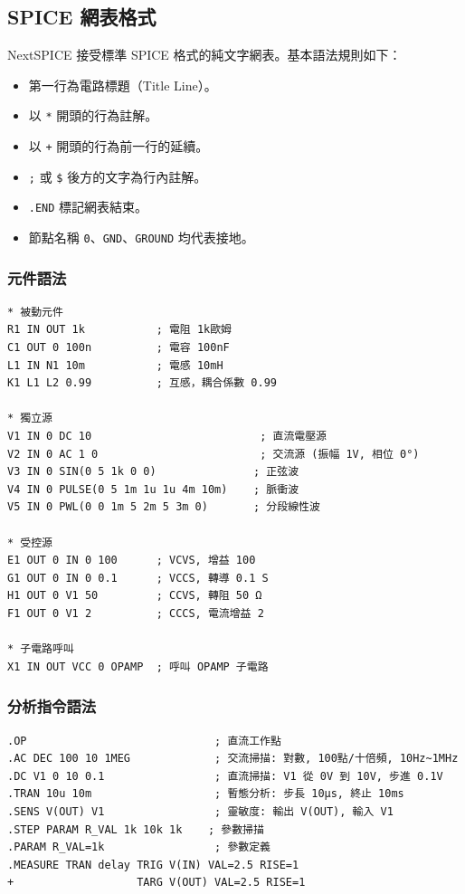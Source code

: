 \documentclass[12pt,a4paper]{article}
\begin{document}
\subsection{SPICE 網表格式}

NextSPICE 接受標準 SPICE 格式的純文字網表。基本語法規則如下：

\begin{itemize}
  \item 第一行為電路標題（Title Line）。
  \item 以 \texttt{*} 開頭的行為註解。
  \item 以 \texttt{+} 開頭的行為前一行的延續。
  \item \texttt{;} 或 \texttt{\$} 後方的文字為行內註解。
  \item \texttt{.END} 標記網表結束。
  \item 節點名稱 \texttt{0}、\texttt{GND}、\texttt{GROUND} 均代表接地。
\end{itemize}

\subsubsection{元件語法}

\begin{lstlisting}[language=SPICE,caption={元件定義範例}]
* 被動元件
R1 IN OUT 1k           ; 電阻 1k歐姆
C1 OUT 0 100n          ; 電容 100nF
L1 IN N1 10m           ; 電感 10mH
K1 L1 L2 0.99          ; 互感，耦合係數 0.99

* 獨立源
V1 IN 0 DC 10                          ; 直流電壓源
V2 IN 0 AC 1 0                         ; 交流源 (振幅 1V, 相位 0°)
V3 IN 0 SIN(0 5 1k 0 0)               ; 正弦波
V4 IN 0 PULSE(0 5 1m 1u 1u 4m 10m)    ; 脈衝波
V5 IN 0 PWL(0 0 1m 5 2m 5 3m 0)       ; 分段線性波

* 受控源
E1 OUT 0 IN 0 100      ; VCVS, 增益 100
G1 OUT 0 IN 0 0.1      ; VCCS, 轉導 0.1 S
H1 OUT 0 V1 50         ; CCVS, 轉阻 50 Ω
F1 OUT 0 V1 2          ; CCCS, 電流增益 2

* 子電路呼叫
X1 IN OUT VCC 0 OPAMP  ; 呼叫 OPAMP 子電路
\end{lstlisting}

\subsubsection{分析指令語法}

\begin{lstlisting}[language=SPICE,caption={分析指令範例}]
.OP                             ; 直流工作點
.AC DEC 100 10 1MEG             ; 交流掃描: 對數, 100點/十倍頻, 10Hz~1MHz
.DC V1 0 10 0.1                 ; 直流掃描: V1 從 0V 到 10V, 步進 0.1V
.TRAN 10u 10m                   ; 暫態分析: 步長 10μs, 終止 10ms
.SENS V(OUT) V1                 ; 靈敏度: 輸出 V(OUT), 輸入 V1
.STEP PARAM R_VAL 1k 10k 1k    ; 參數掃描
.PARAM R_VAL=1k                 ; 參數定義
.MEASURE TRAN delay TRIG V(IN) VAL=2.5 RISE=1
+                   TARG V(OUT) VAL=2.5 RISE=1
\end{lstlisting}
\end{document}
